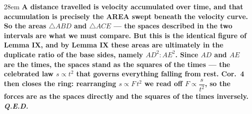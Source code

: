 \documentclass[border=4pt]{standalone}
\begin{document}
\begin{varwidth}{28em}
\large\bfseries
A distance travelled is velocity accumulated over time, and that accumulation is precisely      the AREA swept beneath the velocity curve. So the areas $\triangle ABD$ and      $\triangle ACE$ — the spaces described in the two intervals are what we must compare. But      this is the identical figure of Lemma IX, and by Lemma IX these areas are ultimately in the      duplicate ratio of the base sides, namely $AD^2 : AE^2$. Since $AD$ and $AE$ are      the times, the spaces stand as the squares of the times — the celebrated law $s \propto t^2$      that governs everything falling from rest. Cor.\ 4 then closes the ring: rearranging      $s \propto F\,t^2$ we read off $F \propto \dfrac{s}{t^2}$, so the forces are as the spaces      directly and the squares of the times inversely. \textit{Q.E.D.}
\end{varwidth}
\end{document}

